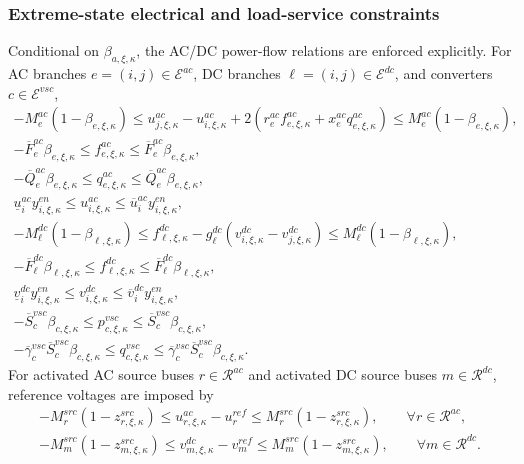 \subsubsection{Extreme-state electrical and load-service constraints}

Conditional on \(\beta_{a,\xi,\kappa}\), the AC/DC power-flow relations are enforced explicitly. For AC branches \(e=(i,j)\in\mathcal{E}^{ac}\), DC branches \(\ell=(i,j)\in\mathcal{E}^{dc}\), and converters \(c\in\mathcal{E}^{vsc}\),
\begin{align}
-M_e^{ac}(1-\beta_{e,\xi,\kappa}) 
\le u_{j,\xi,\kappa}^{ac} - u_{i,\xi,\kappa}^{ac}
+ 2\left(r_e^{ac} f_{e,\xi,\kappa}^{ac} + x_e^{ac} q_{e,\xi,\kappa}^{ac}\right)
\le M_e^{ac}(1-\beta_{e,\xi,\kappa}),
\label{eq:10b-ext-ac-drop}\\
-\overline F_e^{ac}\beta_{e,\xi,\kappa} \le f_{e,\xi,\kappa}^{ac} \le \overline F_e^{ac}\beta_{e,\xi,\kappa},
\label{eq:10b-ext-ac-flow}\\
-\overline Q_e^{ac}\beta_{e,\xi,\kappa} \le q_{e,\xi,\kappa}^{ac} \le \overline Q_e^{ac}\beta_{e,\xi,\kappa},
\label{eq:10b-ext-ac-reactive-flow}\\
\underline u_i^{ac} y_{i,\xi,\kappa}^{en} \le u_{i,\xi,\kappa}^{ac} \le \overline u_i^{ac} y_{i,\xi,\kappa}^{en},
\label{eq:10b-ext-ac-voltage}\\
-M_\ell^{dc}(1-\beta_{\ell,\xi,\kappa})
\le f_{\ell,\xi,\kappa}^{dc} - g_\ell^{dc}(v_{i,\xi,\kappa}^{dc}-v_{j,\xi,\kappa}^{dc})
\le M_\ell^{dc}(1-\beta_{\ell,\xi,\kappa}),
\label{eq:10b-ext-dc-drop}\\
-\overline F_\ell^{dc}\beta_{\ell,\xi,\kappa} \le f_{\ell,\xi,\kappa}^{dc} \le \overline F_\ell^{dc}\beta_{\ell,\xi,\kappa},
\label{eq:10b-ext-dc-flow}\\
\underline v_i^{dc} y_{i,\xi,\kappa}^{en} \le v_{i,\xi,\kappa}^{dc} \le \overline v_i^{dc} y_{i,\xi,\kappa}^{en},
\label{eq:10b-ext-dc-voltage}\\
-\overline S_c^{vsc}\beta_{c,\xi,\kappa} \le p_{c,\xi,\kappa}^{vsc} \le \overline S_c^{vsc}\beta_{c,\xi,\kappa},
\label{eq:10b-ext-vsc-active}\\
-\overline\gamma_c^{vsc}\overline S_c^{vsc}\beta_{c,\xi,\kappa}
\le q_{c,\xi,\kappa}^{vsc} \le
\overline\gamma_c^{vsc}\overline S_c^{vsc}\beta_{c,\xi,\kappa}.
\label{eq:10b-ext-vsc-reactive}
\end{align}
For activated AC source buses \(r\in\mathcal{R}^{ac}\) and activated DC source buses \(m\in\mathcal{R}^{dc}\), reference voltages are imposed by
\begin{align}
-M_r^{src}(1-z_{r,\xi,\kappa}^{src})
\le u_{r,\xi,\kappa}^{ac} - u_r^{ref}
\le M_r^{src}(1-z_{r,\xi,\kappa}^{src}),
\qquad \forall r\in\mathcal{R}^{ac},
\label{eq:10b-ext-ac-root-voltage}\\
-M_m^{src}(1-z_{m,\xi,\kappa}^{src})
\le v_{m,\xi,\kappa}^{dc} - v_m^{ref}
\le M_m^{src}(1-z_{m,\xi,\kappa}^{src}),
\qquad \forall m\in\mathcal{R}^{dc}.
\label{eq:10b-ext-dc-root-voltage}
\end{align}
